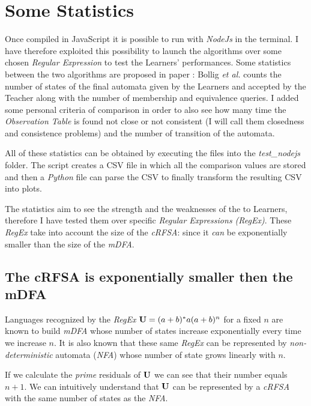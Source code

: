\section{Some Statistics}

Once compiled in JavaScript it is possible to run with \textit{NodeJs} in the terminal. I have therefore exploited this possibility to launch the algorithms over some chosen \textit{Regular Expression} to test the Learners' performances. Some statistics between the two algorithms are proposed in paper \cite{NLPaper}: Bollig \textit{et al.} counts the number of states of the final automata given by the Learners and accepted by the Teacher along with the number of membership and equivalence queries. I added some personal criteria of comparison in order to also see how many time the \textit{Observation Table} is found not close or not consistent (I will call them closedness and consistence problems) and the number of transition of the automata.

All of these statistics can be obtained by executing the files into the \textit{test\_nodejs} folder. The script creates a CSV file in which all the comparison values are stored and then a \textit{Python} file can parse the CSV to finally transform the resulting CSV into plots.

The statistics aim to see the strength and the weaknesses of the to Learners, therefore I have tested them over specific \textit{Regular Expressions (RegEx)}. These \textit{RegEx} take into account the size of the \textit{cRFSA}: since it \textit{can} be exponentially smaller than the size of the \textit{mDFA}.

\subsection{The cRFSA is exponentially smaller then the mDFA}
Languages recognized by the \textit{RegEx} $\mathbf{U} = (a+b)^*a(a+b)^n$ for a fixed $n$ are known to build \textit{mDFA} whose number of states increase exponentially every time we increase $n$. It is also known that these same \textit{RegEx} can be represented by \textit{non-deterministic} automata (\textit{NFA}) whose number of state grows linearly with $n$.

If we calculate the \textit{prime} residuals of $\mathbf{U}$ we can see that their number equals $n+1$. We can intuitively understand that $\mathbf{U}$ can be represented by a \textit{cRFSA} with the same number of states as the \textit{NFA}.

